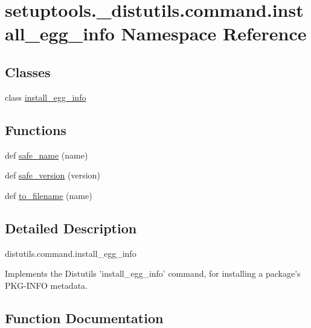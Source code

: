 \hypertarget{namespacesetuptools_1_1__distutils_1_1command_1_1install__egg__info}{}\section{setuptools.\+\_\+distutils.\+command.\+install\+\_\+egg\+\_\+info Namespace Reference}
\label{namespacesetuptools_1_1__distutils_1_1command_1_1install__egg__info}
\subsection*{Classes}
\begin{DoxyCompactItemize}
\item 
class \hyperlink{classsetuptools_1_1__distutils_1_1command_1_1install__egg__info_1_1install__egg__info}{install\+\_\+egg\+\_\+info}
\end{DoxyCompactItemize}
\subsection*{Functions}
\begin{DoxyCompactItemize}
\item 
def \hyperlink{namespacesetuptools_1_1__distutils_1_1command_1_1install__egg__info_abd9f07de5a75a0347709b857d8fd399e}{safe\+\_\+name} (name)
\item 
def \hyperlink{namespacesetuptools_1_1__distutils_1_1command_1_1install__egg__info_a933540b914ceda8116584c9ba792206d}{safe\+\_\+version} (version)
\item 
def \hyperlink{namespacesetuptools_1_1__distutils_1_1command_1_1install__egg__info_ad2e5420c2c1e3ae8af83a2b230873be4}{to\+\_\+filename} (name)
\end{DoxyCompactItemize}


\subsection{Detailed Description}
\begin{DoxyVerb}distutils.command.install_egg_info

Implements the Distutils 'install_egg_info' command, for installing
a package's PKG-INFO metadata.\end{DoxyVerb}
 

\subsection{Function Documentation}
\mbox{\label{namespacesetuptools_1_1__distutils_1_1command_1_1install__egg__info_abd9f07de5a75a0347709b857d8fd399e}} 
